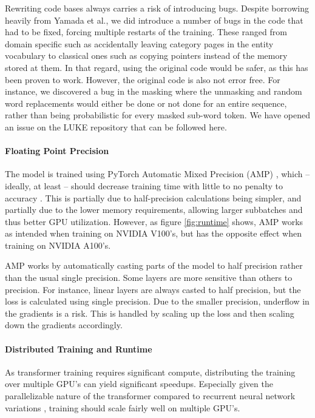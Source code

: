 \documentclass[main.tex]{subfiles}
\begin{document}
Rewriting code bases always carries a risk of introducing bugs.
Despite borrowing heavily from Yamada et al., we did introduce a number of bugs in the code that had to be fixed, forcing multiple restarts of the training.
These ranged from domain specific such as accidentally leaving category pages in the entity vocabulary to classical ones such as copying pointers instead of the memory stored at them.
In that regard, using the original code would be safer, as this has been proven to work.
However, the original code is also not error free.
For instance, we discovered a bug in the masking where the unmasking and random word replacements would either be done or not done for an entire sequence, rather than being probabilistic for every masked sub-word token.
We have opened an issue on the LUKE repository that can be followed here.

\paragraph{Floating Point Precision}
The model is trained using PyTorch Automatic Mixed Precision (AMP) \cite{pytorchamp}, which -- ideally, at least -- should decrease training time with little to no penalty to accuracy \cite{huang2020amp}.
This is partially due to half-precision calculations being simpler, and partially due to the lower memory requirements, allowing larger subbatches and thus better GPU utilization.
However, as figure \ref{fig:runtime} shows, AMP works as intended when training on NVIDIA V100's, but has the opposite effect when training on NVIDIA A100's.

AMP works by automatically casting parts of the model to half precision rather than the usual single precision.
Some layers are more sensitive than others to precision.
For instance, linear layers are always casted to half precision, but the loss is calculated using single precision.
Due to the smaller precision, underflow in the gradients is a risk.
This is handled by scaling up the loss and then scaling down the gradients accordingly.
\cite{pytorchamp}

\paragraph{Distributed Training and Runtime}
As transformer training requires significant compute, distributing the training over multiple GPU's can yield significant speedups.
Especially given the parallelizable nature of the transformer compared to recurrent neural network variations \cite{vaswani2017att}, training should scale fairly well on multiple GPU's.
\end{document}
